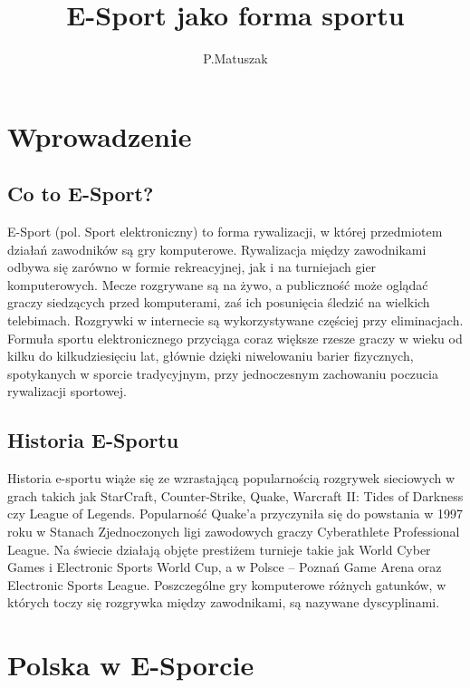 \documentclass{article}
\author{P.Matuszak}
\title{E-Sport jako forma sportu}
\begin{document}
\maketitle
\section{Wprowadzenie}
\subsection{Co to E-Sport?}
E-Sport (pol. Sport elektroniczny) to forma rywalizacji, w której przedmiotem działań zawodników są gry komputerowe. Rywalizacja między zawodnikami odbywa się zarówno w formie rekreacyjnej, jak i na turniejach gier komputerowych. Mecze rozgrywane są na żywo, a publiczność może oglądać graczy siedzących przed komputerami, zaś ich posunięcia śledzić na wielkich telebimach. Rozgrywki w internecie są wykorzystywane częściej przy eliminacjach. Formuła sportu elektronicznego przyciąga coraz większe rzesze graczy w wieku od kilku do kilkudziesięciu lat, głównie dzięki niwelowaniu barier fizycznych, spotykanych w sporcie tradycyjnym, przy jednoczesnym zachowaniu poczucia rywalizacji sportowej.
\subsection{Historia E-Sportu}
Historia e-sportu wiąże się ze wzrastającą popularnością rozgrywek sieciowych w grach takich jak StarCraft, Counter-Strike, Quake, Warcraft II: Tides of Darkness czy League of Legends. Popularność Quake'a przyczyniła się do powstania w 1997 roku w Stanach Zjednoczonych ligi zawodowych graczy Cyberathlete Professional League. Na świecie działają objęte prestiżem turnieje takie jak World Cyber Games i Electronic Sports World Cup, a w Polsce – Poznań Game Arena oraz Electronic Sports League. Poszczególne gry komputerowe różnych gatunków, w których toczy się rozgrywka między zawodnikami, są nazywane dyscyplinami.
\section{Polska w E-Sporcie}
\end{document}
